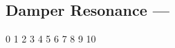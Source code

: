 \subsection[Damper Resonance]{Damper Resonance --- \UiKey{\I}\UiKey{\SET}}









































0
1
2
3
4
5
6
7
8
9
10
